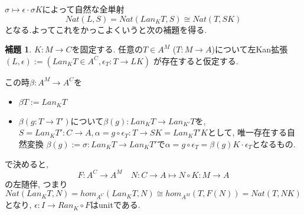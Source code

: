 \documentclass[dvipdfmx,a4paper,11pt]{report}
\theoremstyle{definition}
\newtheorem{lem}[thm]{補題}
\begin{document}
$\sigma \mapsto \epsilon \cdot \sigma K$によって自然な全単射
$$
Nat (L, S)=Nat (Lan_{K}T, S) \cong Nat(T, SK)
$$
となる.よってこれをかっこよくいうと次の補題を得る. 

 \begin{tcolorbox}
 [colback = white, colframe = green!35!black, fonttitle = \bfseries,breakable = true]
\begin{lem}
\label{lem-leftkan-adjoint}
$K : M \to C$を固定する. 
任意の$T \in A^{M}$ ($T : M \to A$)について左Kan拡張
$(L, \epsilon) := (Lan_{K}T \in A^C, \epsilon_{T}: T \to LK)$
が存在すると仮定する.

この時$\beta : A^M \to A^C$を
\begin{itemize}
\item $\beta T := Lan_{K}T$
\item $\beta (g : T \to T')$について$\beta(g) : Lan_{K}T \to Lan_{K'}T$を, 
$S = Lan_{K}T' : C \to A, \alpha =g\circ \epsilon_T : T \to SK = Lan_{K}T' K$として, 唯一存在する自然変換
$\beta(g):=\sigma :  Lan_{K}T \to Lan_{K}T'$で$\alpha =g\circ \epsilon_T  = \beta(g)K \cdot \epsilon_T $となるもの. 
\end{itemize}
で決めると, 
$$
F : A^C \to A^M \quad N :C\to A\mapsto N \circ K : M \to A 
$$
の左随伴, つまり
$$
Nat (Lan_{K}T, N)
=
 hom_{A^C}(Lan_{K}T, N)
 \cong
 hom_{A^M}(T, F(N)) = Nat(T,NK)
$$
となり, $\epsilon :  I \to Ran_{K} \circ F$はunitである. 
\end{lem}
\end{tcolorbox}
\end{document}
